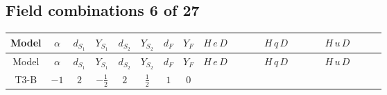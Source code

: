 \documentclass[8pt]{article}
\begin{document}
\begin{landscape}
\subsection*{Field combinations 6 of 27}
\begin{longtable}{@{}cccccccc >{\raggedright\arraybackslash}p{0.21\linewidth} >{\raggedright\arraybackslash}p{0.21\linewidth} >{\raggedright\arraybackslash}p{0.21\linewidth}@{}}
\toprule
Model & $\alpha$ & $d_{S_1}$ & $Y_{S_1}$ & $d_{S_2}$ & $Y_{S_2}$ & $d_F$ & $Y_F$ & $H\,e\,D$ & $H\,q\,D$ & $H\,u\,D$ \\
\midrule
\endfirsthead
\toprule
Model & $\alpha$ & $d_{S_1}$ & $Y_{S_1}$ & $d_{S_2}$ & $Y_{S_2}$ & $d_F$ & $Y_F$ & $H\,e\,D$ & $H\,q\,D$ & $H\,u\,D$ \\
\midrule
\endhead
T3-B & $-1$ & $2$ & $-\frac{1}{2}$ & $2$ & $\frac{1}{2}$ & $1$ & $0$ & \scriptsize\adjustbox{max width=\linewidth}{$\begin{gathered} -\frac{i \hbar  \overline{y_{1,i_3,r_1}} \overline{Y_{e,i_4,i_2}} \overline{e_{i_2}}\, \gamma ^{\mu _1}\, P_R\, e_{i_1} H_{a_1} y_{1,i_4,r_1} Y_{e,i_3,i_1} D_{\mu _1}\left(H_{a_1}\right){}^{\dagger }}{12 m_1^2} \\ -\frac{i \hbar  \text{Delta}\left(i_1,i_2\right) \overline{e_{i_2}}\, \gamma ^{\mu _1}\, P_R\, e_{i_1} g_1^4 H_{a_1} D_{\mu _1}\left(H_{a_1}\right){}^{\dagger }}{120 m_1^2} \\ +\frac{i \hbar  \overline{y_{1,i_3,r_1}} \overline{Y_{e,i_4,i_2}} \overline{e_{i_2}}\, \gamma ^{\mu _1}\, P_R\, e_{i_1} y_{1,i_4,r_1} Y_{e,i_3,i_1} H_{a_1}{}^{\dagger } D_{\mu _1}\left(H_{a_1}\right)}{12 m_1^2}\end{gathered}$} & \scriptsize\adjustbox{max width=\linewidth}{$\begin{gathered} -\frac{i \hbar  \overline{q_{\alpha _1,a_2,i_2}}\, \gamma ^{\mu _1}\, P_L\, q_{\alpha _1,a_2,i_2} H_{a_1} D_{\mu _1}\left(H_{a_1}\right){}^{\dagger } g_2^4}{240 m_1^2} \\ +\frac{i \hbar  \overline{q_{\alpha _1,a_2,i_2}}\, \gamma ^{\mu _1}\, P_L\, q_{\alpha _1,a_1,i_2} H_{a_2} D_{\mu _1}\left(H_{a_1}\right){}^{\dagger } g_2^4}{120 m_1^2} \\ +\frac{i \hbar  \overline{q_{\alpha _1,a_2,i_2}}\, \gamma ^{\mu _1}\, P_L\, q_{\alpha _1,a_2,i_2} H_{a_1}{}^{\dagger } D_{\mu _1}\left(H_{a_1}\right) g_2^4}{240 m_1^2}\end{gathered}$} & \scriptsize\adjustbox{max width=\linewidth}{$\begin{gathered} +\frac{i \hbar  \overline{u_{\alpha _1,i_2}}\, \gamma ^{\mu _1}\, P_R\, u_{\alpha _1,i_2} g_1^4 H_{a_1} D_{\mu _1}\left(H_{a_1}\right){}^{\dagger }}{180 m_1^2} \\ -\frac{i \hbar  \overline{u_{\alpha _1,i_2}}\, \gamma ^{\mu _1}\, P_R\, u_{\alpha _1,i_2} g_1^4 H_{a_1}{}^{\dagger } D_{\mu _1}\left(H_{a_1}\right)}{180 m_1^2}\end{gathered}$} \\

\end{longtable}
\end{landscape}
\end{document}
